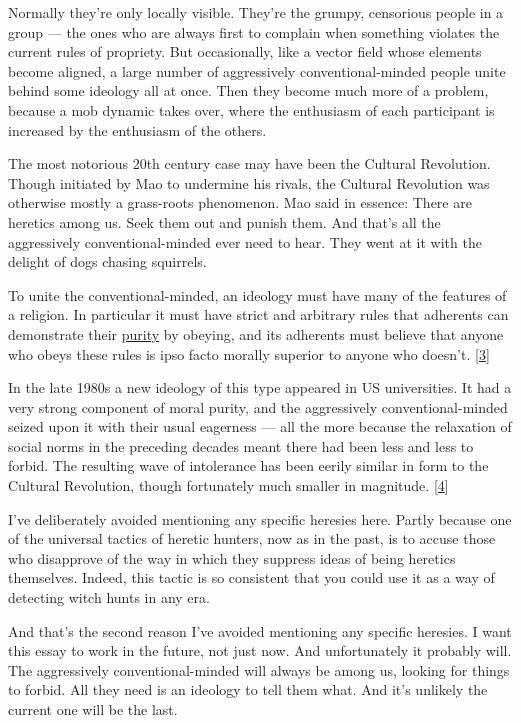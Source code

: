 Normally they're only locally visible. They're the grumpy, censorious
people in a group --- the ones who are always first to complain when
something violates the current rules of propriety. But occasionally,
like a vector field whose elements become aligned, a large number of
aggressively conventional-minded people unite behind some ideology all
at once. Then they become much more of a problem, because a mob dynamic
takes over, where the enthusiasm of each participant is increased by the
enthusiasm of the others.

The most notorious 20th century case may have been the Cultural
Revolution. Though initiated by Mao to undermine his rivals, the
Cultural Revolution was otherwise mostly a grass-roots phenomenon. Mao
said in essence: There are heretics among us. Seek them out and punish
them. And that's all the aggressively conventional-minded ever need to
hear. They went at it with the delight of dogs chasing squirrels.

To unite the conventional-minded, an ideology must have many of the
features of a religion. In particular it must have strict and arbitrary
rules that adherents can demonstrate their
\href{https://www.youtube.com/watch?v=qaHLd8de6nM}{purity} by obeying,
and its adherents must believe that anyone who obeys these rules is ipso
facto morally superior to anyone who doesn't. {[}\hyperref[f3n]{3}{]}

In the late 1980s a new ideology of this type appeared in US
universities. It had a very strong component of moral purity, and the
aggressively conventional-minded seized upon it with their usual
eagerness --- all the more because the relaxation of social norms in the
preceding decades meant there had been less and less to forbid. The
resulting wave of intolerance has been eerily similar in form to the
Cultural Revolution, though fortunately much smaller in magnitude.
{[}\hyperref[f4n]{4}{]}

I've deliberately avoided mentioning any specific heresies here. Partly
because one of the universal tactics of heretic hunters, now as in the
past, is to accuse those who disapprove of the way in which they
suppress ideas of being heretics themselves. Indeed, this tactic is so
consistent that you could use it as a way of detecting witch hunts in
any era.

And that's the second reason I've avoided mentioning any specific
heresies. I want this essay to work in the future, not just now. And
unfortunately it probably will. The aggressively conventional-minded
will always be among us, looking for things to forbid. All they need is
an ideology to tell them what. And it's unlikely the current one will be
the last.

